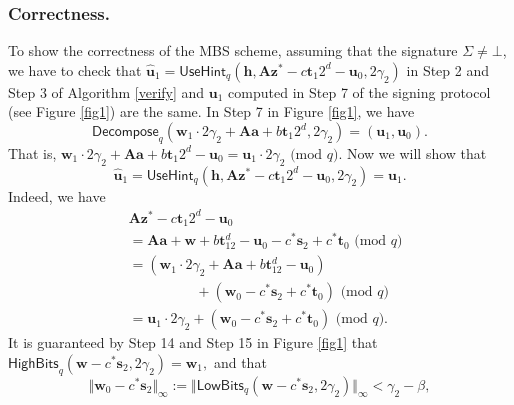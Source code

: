 \documentclass[conference]{IEEEtran}
\begin{document}
	\subsubsection{Correctness.} To show the correctness of the \textsf{MBS} scheme, assuming that the signature $\Sigma \neq \bot$, we have to check that $\widehat{\mathbf{u}}_1=\textsf{UseHint}_q(\mathbf{h}, \mathbf{A}\mathbf{z}^* -c \mathbf{t}_1  2^d- \mathbf{u}_0,2\gamma_2)$ in Step 2 and Step 3 of Algorithm \ref{verify} and $\mathbf{u}_1$ computed in Step 7 of the signing protocol (see Figure \ref{fig1}) are the same. 
	In Step 7 in Figure \ref{fig1}, we have
	$$\mathsf{Decompose}_q(\mathbf{w}_1\cdot 2\gamma_2+\mathbf{A}\mathbf{a}+b\mathbf{t}_1 2^d, 2\gamma_2)=(\mathbf{u}_1, \mathbf{u}_0).$$
	That is, 
	$\mathbf{w}_1\cdot 2\gamma_2+\mathbf{A}\mathbf{a}+b\mathbf{t}_1 2^d- \mathbf{u}_0=\mathbf{u}_1\cdot 2\gamma_2 \text{ (mod } q).$
	Now we will show that 
	\begin{equation*}\label{key3}
	\widehat{\mathbf{u}}_1=\mathsf{UseHint}_q(\mathbf{h},\mathbf{A}\mathbf{z}^*-c\mathbf{t}_1 2^d-\mathbf{u}_0, 2\gamma_2)=\mathbf{u}_1.
	\end{equation*}
	Indeed, we have
	\begin{align*}
&	\mathbf{A}\mathbf{z}^*-c\mathbf{t}_1 2^d-\mathbf{u}_0 \\&=\mathbf{A}\mathbf{a}+\mathbf{w}+b\mathbf{t}_12^d-\mathbf{u}_0 -c^*\mathbf{s}_2+c^*\mathbf{t}_0 \text{ (mod } q)\\
	&=(\mathbf{w}_1\cdot 2\gamma_2 + \mathbf{A}\mathbf{a}+b\mathbf{t}_12^d-\mathbf{u}_0 ) \\ &\hspace{2cm}+(\mathbf{w}_0-c^*\mathbf{s}_2+c^*\mathbf{t}_0) \text{ (mod } q)\\
	&=\mathbf{u}_1\cdot 2\gamma_2 + (\mathbf{w}_0-c^*\mathbf{s}_2+c^*\mathbf{t}_0) \text{ (mod } q).
	\end{align*}
	It is guaranteed by Step 14 and Step 15 in Figure \ref{fig1} that 
	$\mathsf{HighBits}_q(\mathbf{w}-c^*\mathbf{s}_2, 2\gamma_2)=\mathbf{w}_1,$
	and that
	\begin{equation*}\label{keyq}
	\Vert \mathbf{w}_0-c^*\mathbf{s}_2 \Vert_{\infty}:=\Vert \mathsf{LowBits}_q(\mathbf{w}-c^*\mathbf{s}_2, 2\gamma_2) \Vert_{\infty} <\gamma_2-\beta,
	\end{equation*}
\end{document}
